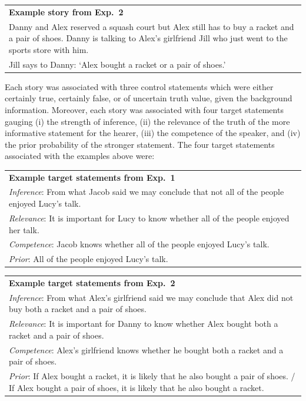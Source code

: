 \documentclass[12pt]{article}
\begin{document}
\begin{center}
\begin{tabular}{p{10cm}}
\textbf{Example story from Exp.\ 2} \\
  Danny and Alex reserved a squash court but Alex still has to buy a racket and a pair of
  shoes. Danny is talking to Alex's girlfriend Jill who just went to the sports store with
  him.\\[.2cm]
  Jill says to Danny: `Alex bought a racket or a pair of shoes.'
\end{tabular}
\end{center}

\noindent Each story was associated with three control statements which were either
certainly true, certainly false, or of uncertain truth value, given the background
information. Moreover, each story was associated with four target statements gauging (i) the strength of inference, (ii) the relevance of the truth of the more informative statement for the hearer, (iii) the competence of the speaker, and (iv) the prior probability of the stronger statement. The four target statements associated with the examples above were:

\begin{center}
\begin{tabular}{p{10cm}}
\textbf{Example target statements from Exp.\ 1} \\[.2cm]
\emph{Inference}: From what Jacob said we may conclude that not all of the people enjoyed Lucy's talk.\\[.1cm]
\emph{Relevance}: It is important for Lucy to know whether all of the people enjoyed her talk.\\[.1cm]
  \emph{Competence}: Jacob knows whether all of the people enjoyed Lucy's talk. \\[.1cm]
  \emph{Prior}: All of the people enjoyed Lucy's talk.
\end{tabular}
\end{center}


\begin{center}
\begin{tabular}{p{10cm}}
\textbf{Example target statements from Exp.\ 2}\\[0.2cm]
  \emph{Inference}: From what Alex's girlfriend said we may conclude that Alex did not buy both a racket and a
  pair of shoes.\\[.2cm]
  \emph{Relevance}: It is important for Danny to know whether Alex bought both a racket and a
  pair of shoes.\\[.2cm]
  \emph{Competence}: Alex's girlfriend knows whether he bought both a racket and a pair of shoes. \\[.2cm]
  \emph{Prior}: If Alex bought a racket, it is likely that he also bought a pair of shoes. / If Alex bought a pair of shoes, it is likely that he also bought a racket.
\end{tabular}
\end{center}
\end{document}
